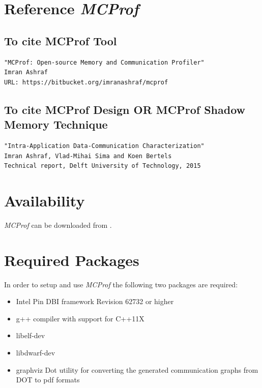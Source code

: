 \documentclass[11pt]{article}
\newcommand{\MCPROF}{\emph{MCProf}}
\begin{document}
\section{Reference \MCPROF{}}


\subsection{To cite MCProf Tool}

{
\scriptsize
\begin{Verbatim}[frame=single, samepage=true]
"MCProf: Open-source Memory and Communication Profiler"
Imran Ashraf
URL: https://bitbucket.org/imranashraf/mcprof
\end{Verbatim}
}

\subsection{To cite MCProf Design OR MCProf Shadow Memory Technique}

{
\scriptsize
\begin{Verbatim}[frame=single, samepage=true]
"Intra-Application Data-Communication Characterization"
Imran Ashraf, Vlad-Mihai Sima and Koen Bertels
Technical report, Delft University of Technology, 2015
\end{Verbatim}
}



\section{Availability}
\label{sec:availability}

\MCPROF{} can be downloaded from \cite{mcprofDownload}.


\section{Required Packages}
\label{sec:reqPackages}

In order to setup and use \MCPROF{} the following two packages are required:

\begin{itemize}

\item Intel Pin DBI framework \cite{Pin_Download} Revision 62732 or higher

\item g++ compiler with support for C++11X

\item libelf-dev

\item libdwarf-dev

\item  graphviz Dot utility for converting the generated communication graphs
    from DOT to pdf formats

\end{itemize}
\end{document}
